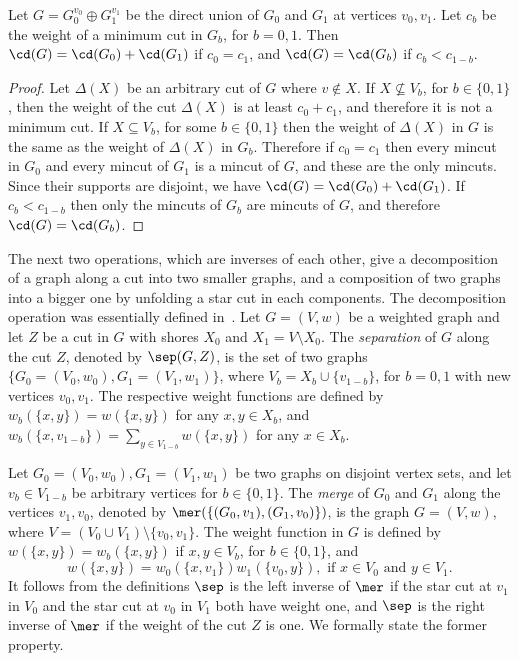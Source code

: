 \begin{claim}
\label{claim:directsum}
Let $G = G_0^{v_0} \oplus  G_1^{v_1}$ be the direct union of $G_0$ and $G_1$ at vertices
$v_0, v_1$.
Let $c_b$ be the weight of a minimum cut in $G_b$, for $b=0,1$.
Then $\cd(G) = \cd(G_0) + \cd(G_1)$ if
$c_0 = c_1$, and $\cd(G) = \cd(G_b)$ if $c_b < c_{1-b}$.
\end{claim}

\begin{proof}
Let $\Delta(X)$ be an arbitrary cut of $G$ where $v \not \in X$.
If $X \not \subseteq   V_b$,
for $b \in \{0,1\}$, then
the weight of the cut $\Delta(X)$ is at least $c_0 + c_1$, and therefore
it is not a minimum cut.  If $X \subseteq   V_b$, for some $b \in \{0,1\}$ then
the weight of $\Delta(X)$ in $G$ is the same as the weight of $\Delta(X)$ in $G_b$.
Therefore if $c_0 = c_1$ then every mincut in $G_0$ and
every mincut of $G_1$ is a mincut of $G$, and these are the only mincuts. Since their supports are disjoint,
we have $\cd(G) = \cd(G_0) + \cd(G_1)$. If $c_b < c_{1-b}$ then only the mincuts of $G_b$ are mincuts of $G$,
and therefore $\cd(G) = \cd(G_b)$.
\end{proof}

The next two operations, which are inverses of each other, give a decomposition of a graph along a cut into two smaller graphs, and a composition of two graphs into a bigger one by unfolding a star cut in
each components. The decomposition operation was essentially defined in~\cite{FF09}.
Let $G= (V,w)$ be a weighted graph and let $Z$ be a cut in $G$ with shores $X_0$ and $X_1 = V \setminus X_0$.
The {\em separation} of $G$ along the cut $Z$, denoted by $\sep(G,Z)$, is the set of two
graphs $\{ G_0= (V_0, w_0), G_1 = (V_1,w_1) \}$, where $V_b = X_b \cup \{v_{1-b}\}$, for
$b=0,1$ with new vertices $v_0, v_1$. The respective weight functions are defined by
$w_b (\{x,y\}) = w (\{x,y\}) $ for any $x,y \in X_b$, and $w_b (\{x,v_{1-b}\}) = \sum_{y \in V_{1-b}} w(\{x,y\})$ for any $x\in X_b$.

Let $G_0= (V_0, w_0), G_1 = (V_1,w_1)$ be two graphs on disjoint vertex sets, and let $v_b \in V_{1-b}$
be arbitrary vertices for $b \in \{0,1\}$. The {\em merge} of $G_0$ and $G_1$ along the vertices $v_1, v_0$,
denoted by $\mer( \{ (G_0, v_1), (G_1, v_0) \} )$,
is the graph $G=(V,w)$, where $V = (V_0 \cup V_1) \setminus \{v_0, v_1\}$. The weight function in $G$
is defined by $w (\{x,y\}) = w_b (\{x,y\})$ if $x,y \in V_b$, for $b \in \{0,1\}$, and
\[w (\{x,y\})  = w_0 (\{x,v_1\})  w_1 (\{v_0,y\}), \text{ if } x \in V_0 \text{ and }y \in V_1.\]
It follows from the definitions $\sep$ is the left inverse of $\mer$ if the star cut
at $v_1$ in $V_0$ and the star cut at $v_0$ in $V_1$ both have weight one,
and $\sep$ is the right inverse of $\mer$ if the weight of the cut $Z$ is one. We formally state
the former property.


